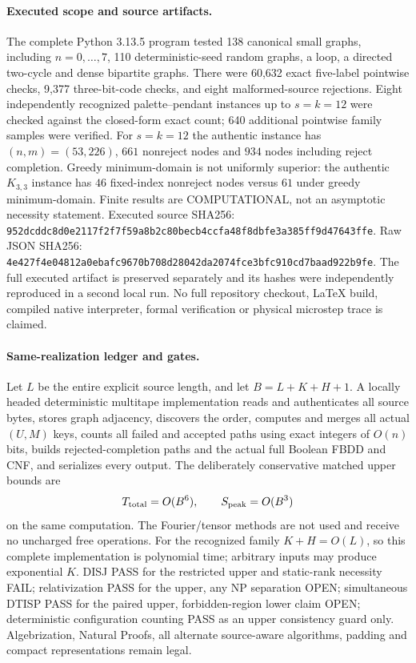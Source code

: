 \documentclass[11pt]{article}
\begin{document}
\paragraph{Executed scope and source artifacts.}
The complete Python 3.13.5 program tested 138 canonical small graphs,
including $n=0,\ldots,7$, 110 deterministic-seed random graphs,
a loop, a directed two-cycle and dense bipartite graphs.
There were 60,632 exact five-label pointwise checks, 9,377
three-bit-code checks, and eight malformed-source rejections.
Eight independently recognized palette--pendant instances up to
$s=k=12$ were checked against the closed-form exact count;
640 additional pointwise family samples were verified.
For $s=k=12$ the authentic instance has $(n,m)=(53,226)$,
$661$ nonreject nodes and $934$ nodes including reject completion.
Greedy minimum-domain is not uniformly superior: the authentic
$K_{3,3}$ instance has $46$ fixed-index nonreject nodes
versus $61$ under greedy minimum-domain. Finite results are
COMPUTATIONAL, not an asymptotic necessity statement.
Executed source SHA256:
\texttt{952dcddc8d0e2117f2f7f59a8b2c80becb4ccfa48f8dbfe3a385ff9d47643ffe}.
Raw JSON SHA256:
\texttt{4e427f4e04812a0ebafc9670b708d28042da2074fce3bfc910cd7baad922b9fe}.
The full executed artifact is preserved separately and its
hashes were independently reproduced in a second local run.
No full repository checkout, LaTeX build, compiled native interpreter,
formal verification or physical microstep trace is claimed.

\paragraph{Same-realization ledger and gates.}
Let $L$ be the entire explicit source length, and let
$B=L+K+H+1$. A locally headed deterministic multitape
implementation reads and authenticates all source bytes,
stores graph adjacency, discovers the order, computes and
merges all actual $(U,M)$ keys, counts all failed and
accepted paths using exact integers of $O(n)$ bits,
builds rejected-completion paths and the actual full
Boolean FBDD and CNF, and serializes every output.
The deliberately conservative matched upper bounds are
\[
 T_{\rm total}=O(B^6),\qquad S_{\rm peak}=O(B^3)
\]
on the same computation. The Fourier/tensor methods are
not used and receive no uncharged free operations.
For the recognized family $K+H=O(L)$, so this complete
implementation is polynomial time; arbitrary inputs may
produce exponential $K$.
DISJ PASS for the restricted upper and static-rank necessity FAIL;
relativization PASS for the upper, any NP separation OPEN;
simultaneous DTISP PASS for the paired upper, forbidden-region
lower claim OPEN; deterministic configuration counting PASS
as an upper consistency guard only.
Algebrization, Natural Proofs, all alternate source-aware
algorithms, padding and compact representations remain legal.
\end{document}
